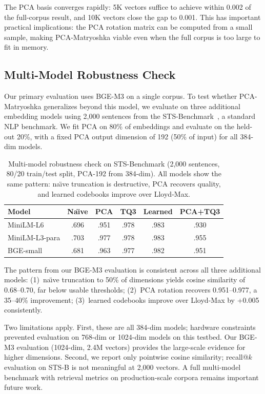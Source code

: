 \documentclass[journal]{IEEEtran}
\begin{document}
The PCA basis converges rapidly: 5K vectors suffice to achieve within 0.002 of the full-corpus result, and 10K vectors close the gap to 0.001.
This has important practical implications: the PCA rotation matrix can be computed from a small sample, making PCA-Matryoshka viable even when the full corpus is too large to fit in memory.

\subsection{Multi-Model Robustness Check}
\label{sec:multimodel}

Our primary evaluation uses BGE-M3 on a single corpus.  To test
whether PCA-Matryoshka generalizes beyond this model, we evaluate
on three additional embedding models using 2{,}000 sentences from
the STS-Benchmark~\cite{cer2017sts}, a standard NLP benchmark.
We fit PCA on 80\% of embeddings and evaluate on the held-out 20\%,
with a fixed PCA output dimension of 192 (50\% of input) for all
384-dim models.

\begin{table}[h]
\centering
\caption{Multi-model robustness check on STS-Benchmark (2{,}000
sentences, 80/20 train/test split, PCA-192 from 384-dim).
All models show the same pattern: na\"{\i}ve truncation is
destructive, PCA recovers quality, and learned codebooks improve
over Lloyd-Max.}
\label{tab:multimodel}
\footnotesize
\begin{tabular}{lccccc}
\toprule
Model & Na\"{\i}ve & PCA & TQ3 & Learned & PCA+TQ3 \\
\midrule
MiniLM-L6      & .696 & .951 & .978 & .983 & .930 \\
MiniLM-L3-para & .703 & .977 & .978 & .983 & .955 \\
BGE-small      & .681 & .963 & .977 & .982 & .951 \\
\bottomrule
\end{tabular}
\end{table}

The pattern from our BGE-M3 evaluation is consistent across all three
additional models: (1)~na\"{\i}ve truncation to 50\% of dimensions
yields cosine similarity of 0.68--0.70, far below usable thresholds;
(2)~PCA rotation recovers 0.951--0.977, a 35--40\% improvement;
(3)~learned codebooks improve over Lloyd-Max by +0.005 consistently.

Two limitations apply.  First, these are all 384-dim models;
hardware constraints prevented evaluation on 768-dim or 1024-dim
models on this testbed.  Our BGE-M3 evaluation (1024-dim, 2.4M
vectors) provides the large-scale evidence for higher dimensions.
Second, we report only pointwise cosine similarity; recall@$k$
evaluation on STS-B is not meaningful at 2{,}000 vectors.
A full multi-model benchmark with retrieval metrics on
production-scale corpora remains important future work.
\end{document}

